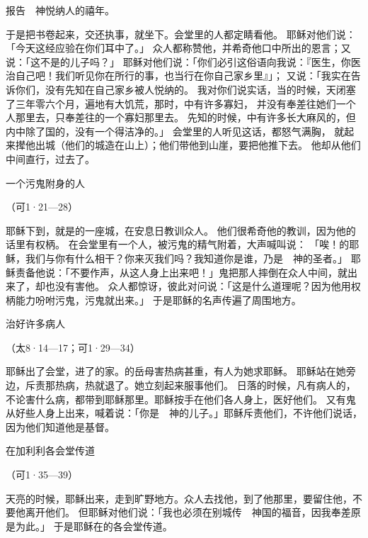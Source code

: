 {\par }{\Q {}报告　神悦纳人的禧年。
\par }{\PP {}于是把书卷起来，交还执事，就坐下。会堂里的人都定睛看他。
耶稣对他们说：「今天这经应验在你们耳中了。」
众人都称赞他，并希奇他口中所出的恩言；又说：「这不是{}的儿子吗？」
耶稣对他们说：「你们必引这俗语向我说：『医生，你医治自己吧！我们听见你在{}所行的事，也当行在你自己家乡里』」；
又说：「我实在告诉你们，没有先知在自己家乡被人悦纳的。
我对你们说实话，当{}的时候，天闭塞了三年零六个月，遍地有大饥荒，那时，{}中有许多寡妇，
并没有奉差往她们一个人那里去，只奉差往{}的{}一个寡妇那里去。
先知{}的时候，{}中有许多长大麻风的，但内中除了{}国的{}，没有一个得洁净的。」
会堂里的人听见这话，都怒气满胸，
就起来撵他出城（他们的城造在山上）；他们带他到山崖，要把他推下去。
他却从他们中间直行，过去了。
\par }{\SH 一个污鬼附身的人
\par }{\R （可1·21—28）
\par }{\PP {}耶稣下到{}，就是{}的一座城，在安息日教训众人。
他们很希奇他的教训，因为他的话里有权柄。
在会堂里有一个人，被污鬼的精气附着，大声喊叫说：
「唉！{}的耶稣，我们与你有什么相干？你来灭我们吗？我知道你是谁，乃是　神的圣者。」
耶稣责备他说：「不要作声，从这人身上出来吧！」鬼把那人摔倒在众人中间，就出来了，却也没有害他。
众人都惊讶，彼此对问说：「这是什么道理呢？因为他用权柄能力吩咐污鬼，污鬼就出来。」
于是耶稣的名声传遍了周围地方。
\par }{\SH 治好许多病人
\par }{\R （太8·14—17；可1·29—34）
\par }{\PP {}耶稣出了会堂，进了{}的家。{}的岳母害热病甚重，有人为她求耶稣。
耶稣站在她旁边，斥责那热病，热就退了。她立刻起来服事他们。
日落的时候，凡有病人的，不论害什么病，都带到耶稣那里。耶稣按手在他们各人身上，医好他们。
又有鬼从好些人身上出来，喊着说：「你是　神的儿子。」耶稣斥责他们，不许他们说话，因为他们知道他是基督。
\par }{\SH 在加利利各会堂传道
\par }{\R （可1·35—39）
\par }{\PP {}天亮的时候，耶稣出来，走到旷野地方。众人去找他，到了他那里，要留住他，不要他离开他们。
但耶稣对他们说：「我也必须在别城传　神国的福音，因我奉差原是为此。」
于是耶稣在{}的各会堂传道。

}
